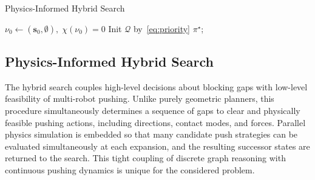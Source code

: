 \begin{algorithm}[t!]
\caption{Physics-Informed Hybrid Search}\label{alg:push}
\SetAlgoLined
{}

\KwOut{$\pi^\star$}
$\nu_0\gets(\mathbf{s}_0,\emptyset),\;\chi(\nu_0)=0$\;
Init $\mathcal{Q}$ by~\eqref{eq:priority}\;
\Return $\pi^\star$;
\end{algorithm}



\subsection{Physics-Informed Hybrid Search}\label{subsec:simloop}

The hybrid search couples high-level decisions about blocking gaps with
low-level feasibility of multi-robot pushing. Unlike purely geometric
planners, this procedure simultaneously determines a sequence of gaps to clear
and physically feasible pushing actions, including directions, contact modes,
and forces. Parallel physics simulation is embedded so that many candidate
push strategies can be evaluated simultaneously at each expansion, and the resulting
successor states are returned to the search. This tight coupling of discrete
graph reasoning with continuous pushing dynamics is unique for the considered problem.

